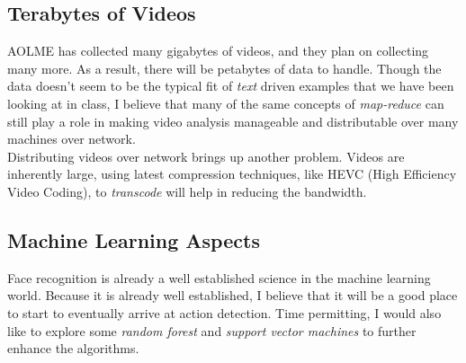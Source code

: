 \documentclass[paper=a4, fontsize=11pt]{scrartcl} %
\numberwithin{equation}{section} %
\numberwithin{figure}{section} %
\numberwithin{table}{section} %
\begin{document}
\subsection{Terabytes of Videos} 
AOLME has collected many gigabytes of videos, and they plan on collecting many more. As a result, there will be petabytes
of data to handle. Though the data doesn't seem to be the typical fit of \textit{text} driven examples that we have been
looking at in class, I believe that many of the same concepts of \textit{map-reduce} can still play a role in making video
analysis manageable and distributable over many machines over network.\\
Distributing videos over network brings up another problem. Videos are inherently large, using latest compression 
techniques, like HEVC (High Efficiency Video Coding), to \textit{transcode} will help in reducing the bandwidth.

\subsection{Machine Learning Aspects}
Face recognition is already a well established science in the machine learning world. Because it is already well established, 
I believe that it will be a good place to start to eventually arrive at action detection. Time permitting, I would also like to 
explore some \textit{random forest} and \textit{support vector machines} to further enhance the algorithms. 
\end{document}
